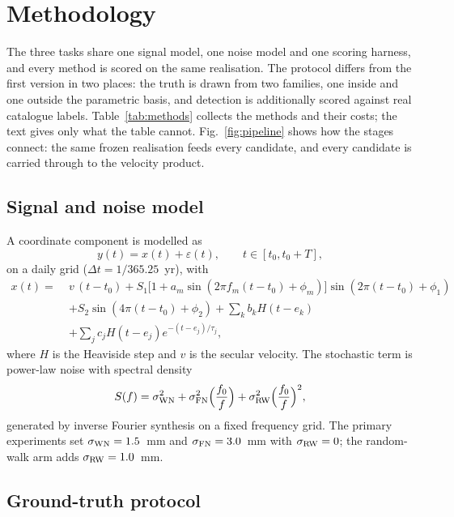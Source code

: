\section{Methodology}
\label{sec:method}

The three tasks share one signal model, one noise model and one scoring harness,
and every method is scored on the same realisation. The protocol differs from
the first version in two places: the truth is drawn from two families, one inside
and one outside the parametric basis, and detection is additionally scored
against real catalogue labels. Table~\ref{tab:methods} collects the methods and
their costs; the text gives only what the table cannot. Fig.~\ref{fig:pipeline}
shows how the stages connect: the same frozen realisation feeds every candidate,
and every candidate is carried through to the velocity product.

\subsection{Signal and noise model}
\label{sec:method:model}

A coordinate component is modelled as
\begin{equation}
y(t) = x(t) + \varepsilon(t), \qquad t\in[t_0,t_0+T],
\label{eq:obs}
\end{equation}
on a daily grid ($\Delta t=1/365.25$~yr), with
\begin{equation}
\label{eq:signal}
\begin{aligned}
x(t) =\;& v\,(t-t_0)
+ S_1\bigl[1+a_m\sin(2\pi f_m(t-t_0)+\phi_m)\bigr]
\sin(2\pi(t-t_0)+\phi_1) \\
&+ S_2\sin(4\pi(t-t_0)+\phi_2)
+ \sum_k b_k H(t-e_k) \\
&+ \sum_j c_j H(t-e_j)e^{-(t-e_j)/\tau_j},
\end{aligned}
\end{equation}
where $H$ is the Heaviside step and $v$ is the secular velocity. The stochastic
term is power-law noise with spectral density
\begin{equation}
S(f)=\sigma_{\rm WN}^2+\sigma_{\rm FN}^2\Bigl(\frac{f_0}{f}\Bigr)
+\sigma_{\rm RW}^2\Bigl(\frac{f_0}{f}\Bigr)^2,
\label{eq:psd}
\end{equation}
generated by inverse Fourier synthesis on a fixed frequency grid. The primary
experiments set $\sigma_{\rm WN}=1.5$~mm and $\sigma_{\rm FN}=3.0$~mm with
$\sigma_{\rm RW}=0$; the random-walk arm adds $\sigma_{\rm RW}=1.0$~mm.

\subsection{Ground-truth protocol}
\label{sec:method:inject}

